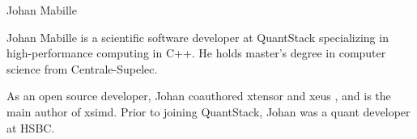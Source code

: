 \begin{participant}[type=R,PM=0,gender=male]{Johan Mabille}


  Johan Mabille is a scientific software developer at QuantStack specializing in high-performance computing in C++. He holds master's degree in computer science from Centrale-Supelec.

  As an open source developer, Johan coauthored xtensor and xeus , and is the main author of xsimd. Prior to joining QuantStack, Johan was a quant developer at HSBC.

\end{participant}

